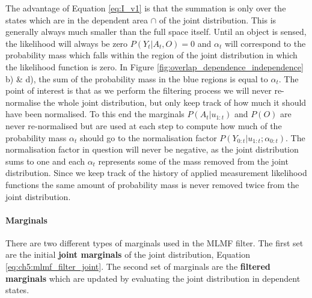 The advantage of Equation \ref{eq:I_v1} is that the summation is only over the states which are in the dependent area $\cap$ of the joint 
distribution. This is generally always much smaller than the full space itself.
Until an object is sensed, the likelihood will always be zero $P(Y_t|A_t,O) = 0$ and $\alpha_t$ will correspond to the probability 
mass which falls within the region of the joint distribution in which the likelihood function is zero. In Figure 
\ref{fig:overlap_dependence_independence} b) \& d), the sum of the probability mass in the blue 
regions is equal to $\alpha_t$.
The point of interest is that as we perform the filtering process we will never re-normalise the whole joint distribution, but only keep 
track of how much it should have been normalised. To this end the marginals $P(A_t|u_{1:t})$ and $P(O)$  are never re-normalised but are used
at each step to compute how much of the probability mass $\alpha_t$ should go to the normalisation factor $P(Y_{0:t}|u_{1:t};\alpha_{0:t})$. 
The normalisation factor in question will never be negative, as the joint distribution sums to one and each $\alpha_t$ represents some of the mass removed from the joint distribution. Since we 
keep track of the history of applied  measurement likelihood functions the same amount of probability mass is never removed twice
from the joint distribution.

\paragraph{Marginals}

There are two different types of marginals used in the MLMF filter. The first set are the initial \textbf{joint marginals} of the joint distribution, Equation \ref{eq:ch5:mlmf_filter_joint}.
The second set of marginals are the \textbf{filtered marginals} which are updated by evaluating the joint distribution in dependent states.


\begin{center}
%
\end{center}

